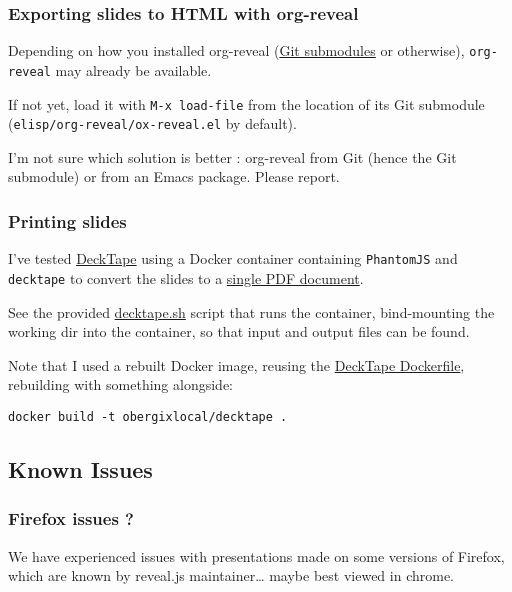 \documentclass[a4paper]{article}
\begin{document}
\subsubsection{Exporting slides to HTML with org-reveal}
\label{sec:org896fced}

Depending on how you installed org-reveal (\hyperref[sec:orgd506fc4]{Git submodules} or otherwise), \texttt{org-reveal} may already be available.

If not yet, load it with \texttt{M-x load-file} from the location of its Git submodule (\texttt{elisp/org-reveal/ox-reveal.el} by default).

\begin{NOTES}
I'm not sure which solution is better : org-reveal from Git (hence the Git submodule) or from an Emacs package. Please report.
\end{NOTES}

\subsubsection{Printing slides}
\label{sec:org0fe73d3}

I've tested \href{https://github.com/astefanutti/decktape}{DeckTape} using a Docker container containing \texttt{PhantomJS} and
\texttt{decktape} to convert the slides to a \href{slides.pdf}{single PDF document}.

See the provided \href{bin/decktape.sh}{decktape.sh} script that runs the container, bind-mounting the
working dir into the container, so that input and output files can be
found.

Note that I used a rebuilt Docker image, reusing the \href{https://raw.githubusercontent.com/astefanutti/decktape/master/Dockerfile}{DeckTape
Dockerfile}, rebuilding with something alongside:
\begin{verbatim}
docker build -t obergixlocal/decktape .
\end{verbatim}

\subsection{Known Issues}
\label{sec:org9056025}

\subsubsection{Firefox issues ?}
\label{sec:org446a592}

We have experienced issues with presentations made on some versions of Firefox, which are known by reveal.js maintainer\ldots{} maybe best viewed in chrome.
\end{document}
